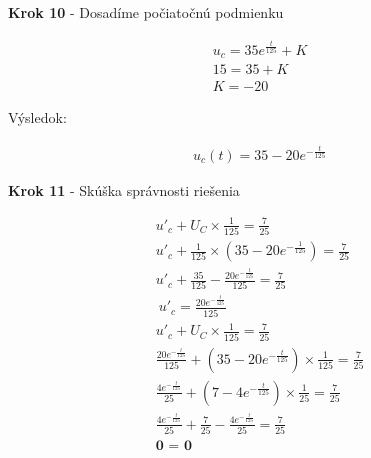 \begin{center}
    \textbf{Krok 10} - Dosadíme počiatočnú podmienku
\end{center}

\begin{gather*}
   u_{c} = 35e^{\frac{t}{125}} + K \\
   15 = 35 + K \\
    K = - 20
\end{gather*}


Výsledok:

\begin{gather*}
	u_{c}(t) = 35-20e^{-\frac{t}{125}}
\end{gather*}

\begin{center}
    \textbf{Krok 11} - Skúška správnosti riešenia 
\end{center}

\begin{gather*}
    u'_{c} + U_{C} \times \frac {1} {125} = \frac {7} {25} \\
    u'_{c} + \frac{1}{125} \times (35-20e^{-\frac{1}{125}}) = \frac {7} {25}\\
    u'_{c} + \frac {35}{125} - \frac {20e^{- \frac {t}{125}}} {125} = \frac {7} {25} \\\
    u'_{c} = \frac {20e^{- \frac {t}{125}}} {125} \\
    u'_{c} + U_{C} \times \frac {1} {125} = \frac {7} {25} \\
    \frac {20e^{- \frac {t}{125}}} {125} + (35-20e^{-\frac{t}{125}}) \times \frac {1}{125} = \frac {7}{25} \\
    \frac {4e^{- \frac {t}{125}}} {25} + (7-4e^{-\frac{t}{125}}) \times \frac {1}{25} = \frac {7}{25} \\
    \frac {4e^{- \frac {t}{125}}} {25} + \frac {7}{25} - \frac {4e^{-\frac{t}{125}}} {25} = \frac {7}{25} \\
    \textbf{0 = 0} \\
\end{gather*}



